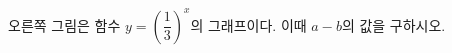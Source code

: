 \noindent\begin{minipage}[t]{0.58\linewidth}\vspace{0pt}\raggedright 오른쪽 그림은 함수 $y=\left(\dfrac{1}{3}\right)^{x}$의 그래프이다. 이때 $a-b$의 값을 구하시오.\end{minipage}\hfill\begin{minipage}[t]{0.4\linewidth}\vspace{0pt}\centering \resizebox{\ifdim\width>\linewidth\linewidth\else\width\fi}{!}{}\end{minipage}\par

